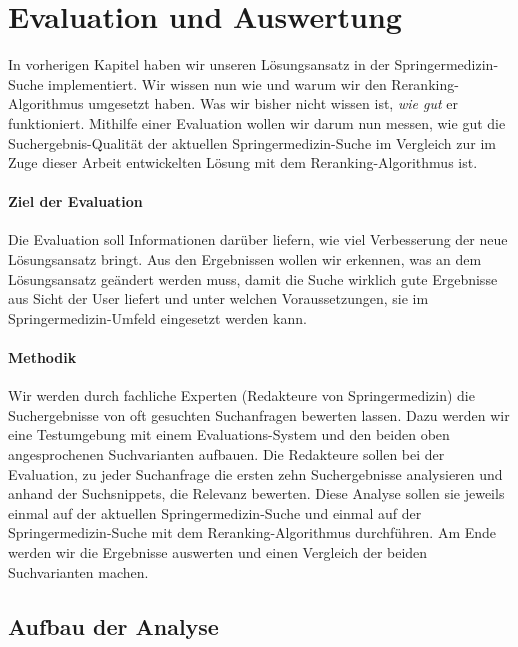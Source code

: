 %
\chapter{Evaluation und Auswertung}
\label{sec:Evaluation}

In vorherigen Kapitel haben wir unseren Lösungsansatz in der Springermedizin-Suche implementiert. Wir wissen nun wie und warum wir den Reranking-Algorithmus umgesetzt haben. Was wir bisher nicht wissen ist, \textit{wie gut} er funktioniert. Mithilfe einer Evaluation wollen wir darum nun messen, wie gut die Suchergebnis-Qualität der aktuellen Springermedizin-Suche im Vergleich zur im Zuge dieser Arbeit entwickelten Lösung mit dem Reranking-Algorithmus ist. 

\subsubsection{Ziel der Evaluation}
\label{sec:Evaluation:Einfuehrung:Ziel}

Die Evaluation soll Informationen darüber liefern, wie viel Verbesserung der neue Lösungsansatz bringt. Aus den Ergebnissen wollen wir erkennen, was an dem Lösungsansatz geändert werden muss, damit die Suche wirklich gute Ergebnisse aus Sicht der User liefert und unter welchen Voraussetzungen, sie im Springermedizin-Umfeld eingesetzt werden kann.

\subsubsection{Methodik}
\label{sec:Evaluation:Einfuehrung:Methodik}
Wir werden durch fachliche Experten (Redakteure von Springermedizin) die Suchergebnisse von oft gesuchten Suchanfragen bewerten lassen. Dazu werden wir eine Testumgebung mit einem Evaluations-System und den beiden oben angesprochenen Suchvarianten aufbauen. Die Redakteure sollen bei der Evaluation, zu jeder Suchanfrage die ersten zehn Suchergebnisse analysieren und anhand der Suchsnippets, die Relevanz bewerten. Diese Analyse sollen sie jeweils einmal auf der aktuellen Springermedizin-Suche und einmal auf der Springermedizin-Suche mit dem Reranking-Algorithmus durchführen. Am Ende werden wir die Ergebnisse auswerten und einen Vergleich der beiden Suchvarianten machen. 

\section{Aufbau der Analyse}
\label{sec:Evaluation:Aufbau}

